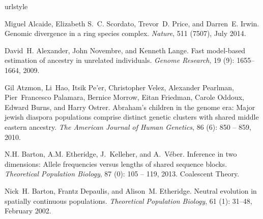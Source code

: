 \documentclass[10pt,letterpaper]{article}
\begin{document}
%
%
% 
\begin{thebibliography}{80}
\providecommand{\natexlab}[1]{#1}
\providecommand{\url}[1]{\texttt{#1}}
\expandafter\ifx\csname urlstyle\endcsname\relax
  \providecommand{\doi}[1]{doi: #1}\else
  \providecommand{\doi}{doi: \begingroup \urlstyle{rm}\Url}\fi

Miguel Alcaide, Elizabeth S.~C. Scordato, Trevor~D. Price, and Darren~E. Irwin.
\newblock Genomic divergence in a ring species complex.
\newblock \emph{Nature}, 511 (7507), July 2014.

David~H. Alexander, John Novembre, and Kenneth Lange.
\newblock Fast model-based estimation of ancestry in unrelated individuals.
\newblock \emph{Genome Research}, 19 (9): 1655--1664, 2009.

Gil Atzmon, Li~Hao, Itsik Pe'er, Christopher Velez, Alexander Pearlman,
  Pier~Francesco Palamara, Bernice Morrow, Eitan Friedman, Carole Oddoux,
  Edward Burns, and Harry Ostrer.
\newblock Abraham's children in the genome era: Major jewish diaspora
  populations comprise distinct genetic clusters with shared middle eastern
  ancestry.
\newblock \emph{The American Journal of Human Genetics}, 86
  (6): 850 -- 859, 2010.

N.H. Barton, A.M. Etheridge, J.~Kelleher, and A.~Véber.
\newblock Inference in two dimensions: Allele frequencies versus lengths of
  shared sequence blocks.
\newblock \emph{Theoretical Population Biology}, 87 (0): 105
  -- 119, 2013.
\newblock Coalescent Theory.

Nick~H. Barton, Frantz Depaulis, and Alison~M. Etheridge.
\newblock Neutral evolution in spatially continuous populations.
\newblock \emph{Theoretical Population Biology}, 61 (1):
  31--48, February 2002.


\end{thebibliography}
\end{document}
